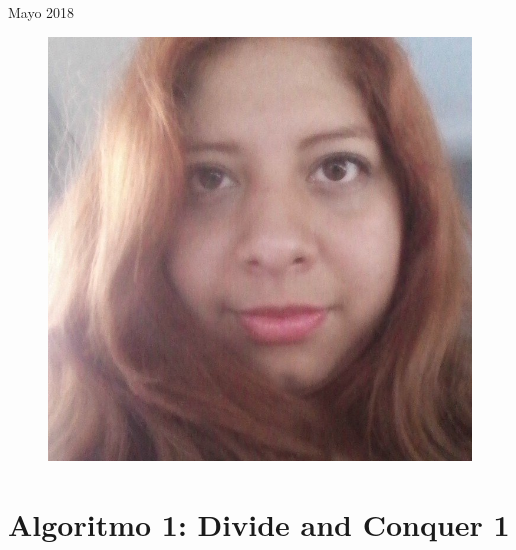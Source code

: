 \documentclass[12pt, fleqn]{article}                             %
\theoremstyle{break}                                            %
\begin{document}
\begin{titlepage}
    {\large \textsf{Mayo 2018}}                                  %

   
    \begin{figure}[H]
               \centering
                \includegraphics[scale=.2]{Laura.jpg}
            \end{figure}
\end{titlepage}


\restoregeometry                                                    %
\nopagecolor                                                        %




\tableofcontents{}
\label{sec:Index}

\clearpage
\section{Algoritmo 1: Divide and Conquer 1}
\end{document}
